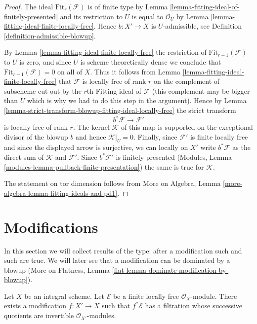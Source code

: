 \begin{proof}
The ideal $\text{Fit}_r(\mathcal{F})$ is of finite type
by Lemma \ref{lemma-fitting-ideal-of-finitely-presented}
and its restriction to $U$ is equal to $\mathcal{O}_U$ by
Lemma \ref{lemma-fitting-ideal-finite-locally-free}.
Hence $b : X' \to X$ is $U$-admissible, see
Definition \ref{definition-admissible-blowup}.

\medskip\noindent
By Lemma \ref{lemma-fitting-ideal-finite-locally-free}
the restriction of $\text{Fit}_{r - 1}(\mathcal{F})$
to $U$ is zero, and since $U$ is scheme theoretically dense
we conclude that $\text{Fit}_{r - 1}(\mathcal{F}) = 0$
on all of $X$. Thus it follows from
Lemma \ref{lemma-fitting-ideal-finite-locally-free}
that $\mathcal{F}$ is locally free of rank $r$
on the complement of subscheme cut out by the $r$th
Fitting ideal of $\mathcal{F}$ (this complement may
be bigger than $U$ which is why we had to do this step
in the argument). Hence by
Lemma \ref{lemma-strict-transform-blowup-fitting-ideal-locally-free}
the strict transform
$$
b^*\mathcal{F} \longrightarrow \mathcal{F}'
$$
is locally free of rank $r$. The kernel $\mathcal{K}$
of this map is supported on the exceptional divisor
of the blowup $b$ and hence $\mathcal{K}|_U = 0$.
Finally, since $\mathcal{F}'$ is finite locally free
and since the displayed arrow is surjective, we can
locally on $X'$ write $b^*\mathcal{F}$ as the
direct sum of $\mathcal{K}$ and $\mathcal{F}'$.
Since $b^*\mathcal{F}'$ is finitely presented
(Modules, Lemma \ref{modules-lemma-pullback-finite-presentation})
the same is true for $\mathcal{K}$.

\medskip\noindent
The statement on tor dimension follows from
More on Algebra, Lemma \ref{more-algebra-lemma-fitting-ideals-and-pd1}.
\end{proof}





\section{Modifications}
\label{section-modifications}

\noindent
In this section we will collect results of the type: after a modification
such and such are true. We will later see that a modification can be
dominated by a blowup (More on Flatness, Lemma
\ref{flat-lemma-dominate-modification-by-blowup}).

\begin{lemma}
\label{lemma-filter-after-modification}
Let $X$ be an integral scheme. Let $\mathcal{E}$ be a finite locally free
$\mathcal{O}_X$-module. There exists a modification $f : X' \to X$
such that $f^*\mathcal{E}$ has a filtration whose successive quotients
are invertible $\mathcal{O}_{X'}$-modules.
\end{lemma}


